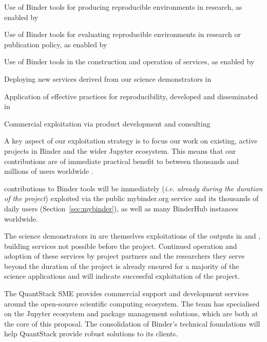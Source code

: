 \begin{compactenum}
  \item Use of Binder tools for producing reproducible environments in research, as enabled by 
  \item Use of Binder tools for evaluating reproducible environments in research or publication policy, as enabled by 
  \item Use of Binder tools in the construction and operation of services, as enabled by 
  \item Deploying new services derived from our science demonstrators in 
  \item Application of effective practices for reproducibility, developed and disseminated in 
  \item Commercial exploitation via product development and consulting 
\end{compactenum}

A key aspect of our exploitation strategy is to focus our work on existing,
active projects in Binder and the wider Jupyter ecosystem.
This means that our contributions are of immediate practical benefit to between
thousands and millions of users worldwide .

\TheProject contributions to Binder tools will be immediately (\emph{i.e.
  already during the duration of the project}) exploited via the public mybinder.org service
and its thousands of daily users (Section~\ref{sec:mybinder}), as well as many BinderHub instances worldwide.

The science demonstrators in  are themselves exploitations of the outputs
in  and ,
building services not possible before the project.
Continued operation and adoption of these services by project partners and the researchers they serve beyond
the duration of the project is already ensured for a majority of the science applications and will indicate
successful exploitation of the project.


The QuantStack SME provides commercial support and development services around the
open-source scientific computing ecosystem. The team has specialised on the Jupyter ecosystem
and package management solutions, which are both at the core of this proposal. The consolidation
of Binder's technical foundations will help QuantStack provide robust solutions to its clients.

